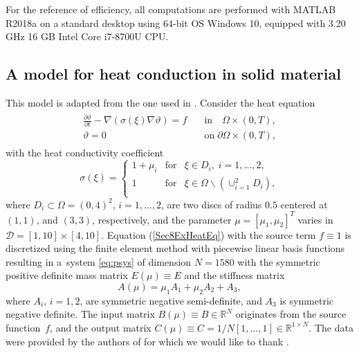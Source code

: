 For the reference of efficiency, all computations are performed with
MATLAB R2018a on a standard desktop using 64-bit OS
Windows 10, equipped with 3.20 GHz 16 GB Intel Core
i7-8700U CPU.
\subsection{A model for heat conduction in solid material}
This model is adapted from the one used in \cite{KrePT14}.  Consider the heat equation
\begin{align}
\begin{split}\label{Sec8ExHeatEq}
\frac{\partial \vartheta}{\partial t}-\nabla(\sigma(\xi)\nabla \vartheta) = f&\quad \mbox{in}\quad \Omega\times (0,T),\\
\vartheta=0&\quad \mbox{on}\; \partial\Omega \times (0,T),
\end{split}
\end{align}
with the heat conductivity coefficient
\begin{equation}
\sigma(\xi) = \left\{ 
\begin{array}{lcl}
1+\mu_i&\mbox{for}&\xi\in D_i, \; i=1,\ldots,2,\\
1&\mbox{for}&\xi\in \Omega\backslash (\cup_{i=1}^2D_i),\\
\end{array}
\right.
\end{equation}
where $D_i\subset \Omega=(0,4)^2$, $i=1,\ldots,2$, are two discs of radius $0.5$ centered at $(1,1)$,%
 and $(3,3)$, respectively, and the parameter $\mu=[\mu_1,\mu_2]^T$ 
varies in $\mathcal{D}=[1,10]\times [4,10]$. Equation (\ref{Sec8ExHeatEq}) with the source term $f\equiv 1$ is 
discretized using the finite element method with piecewise linear basis functions resulting in 
a~system \eqref{eq:psys} of dimension $N=1580$ with the symmetric positive definite mass matrix 
$E(\mu)\equiv E$ and the stiffness matrix
\begin{equation}
A(\mu) = \mu_1A_1 + \mu_2 A_2 + A_3,
\end{equation}
where $A_i$, $i=1, 2$, are symmetric negative semi-definite, and $A_3$ is symmetric negative definite. 
The input matrix $B(\mu)\equiv B\in\mathbb{R}^{N}$ originates from the source function~$f$, and the output matrix
$C(\mu)\equiv C=1/N[1,\ldots, 1]\in\mathbb{R}^{1\times N}$. 
The data were provided by the authors of \cite{KrePT14} for which we would like to thank . %

